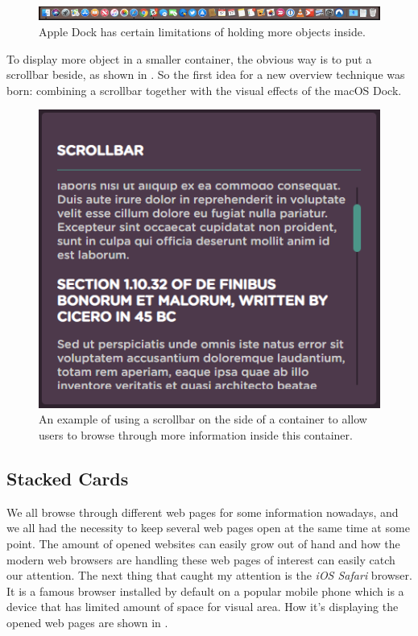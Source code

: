 \begin{figure}[th]
\centering
\includegraphics[width=\textwidth,keepaspectratio]{Figures/Chapter1/macosdock2.png}
\decoRule
\caption[MacOS Dock with More Apps]{Apple Dock has certain limitations of holding more objects inside.}
\label{fig:macosdock2}
\end{figure}

To display more object in a smaller container, the obvious way is to put a scrollbar beside, as shown in . So the first idea for a new overview technique was born: combining a scrollbar together with the visual effects of the macOS Dock.

\begin{figure}[H]
\centering
\includegraphics[width=.5\textwidth,keepaspectratio]{Figures/Chapter1/scrollbar.png}
\decoRule
\caption[Modern-looking Scrollbar]{An example of using a scrollbar on the side of a container to allow users to browse through more information inside this container.}
\label{fig:scrollbar}
\end{figure}

\subsection{Stacked Cards}

We all browse through different web pages for some information nowadays, and we all had the necessity to keep several web pages open at the same time at some point. The amount of opened websites can easily grow out of hand and how the modern web browsers are handling these web pages of interest can easily catch our attention. The next thing that caught my attention is the \emph{iOS Safari} browser. It is a famous browser installed by default on a popular mobile phone which is a device that has limited amount of space for visual area. How it's displaying the opened web pages are shown in .

